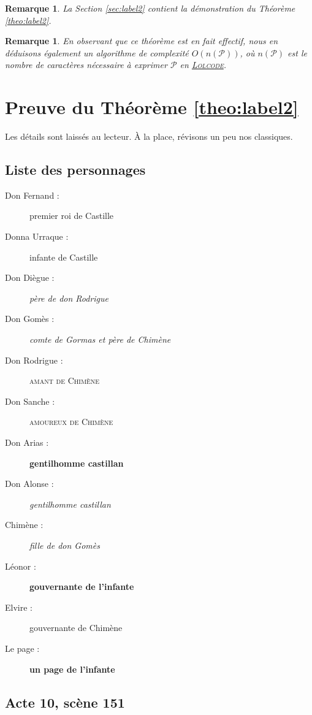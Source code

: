 \documentclass{article}
\newtheorem{remark}[definition]{Remarque}
\begin{document}
	\begin{remark}
		La Section \ref{sec:label2} contient la démonstration du Théorème \ref{theo:label2}.
	\end{remark}
	
	\begin{remark}
		En observant que ce théorème est en fait effectif, nous en déduisons également un algorithme de complexité $O(n(\mathcal{P}))$, où $n(\mathcal{P})$ est le nombre de caractères nécessaire à exprimer $\mathcal{P}$ en \href{https://lolcode.org/}{\textsc{Lolcode}}.
	\end{remark}
	
	\section{Preuve du Théorème \ref{theo:label2}}
	Les détails sont laissés au lecteur. À la place, révisons un peu nos classiques.
	\label{sec:label2}
	
	\subsection{Liste des personnages}
	\label{subsec:label1}
	
	\begin{description}
		\item[Don Fernand :] premier roi de Castille
		\item[Donna Urraque :] infante de Castille
		\item[Don Diègue :] \emph{père de don Rodrigue}
		\item[Don Gomès :] \emph{comte de Gormas et père de Chimène}
		\item[Don Rodrigue :] \textsc{amant de Chimène}
		\item[Don Sanche :] \textsc{amoureux de Chimène}
		\item[Don Arias :] \textbf{gentilhomme castillan}
		\item[Don Alonse :] \emph{gentilhomme castillan}
		\item[Chimène :] \emph{fille de don Gomès}
		\item[Léonor :] \textbf{gouvernante de l’infante}
		\item[Elvire :] gouvernante de Chimène
		\item[Le page :] \textbf{un page de l’infante}
	\end{description}
	
	\subsection{Acte 10, scène 151}
	\label{subsec:label2}
	
\end{document}
